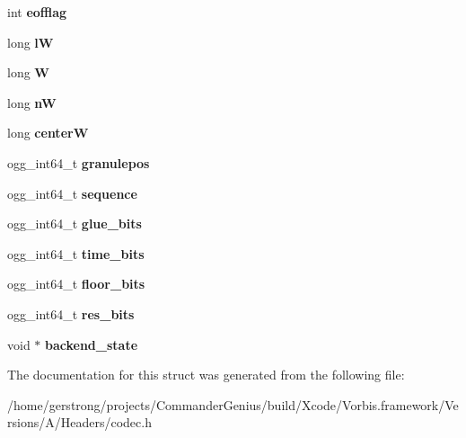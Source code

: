 \begin{DoxyCompactItemize}
\item 
\hypertarget{structvorbis__dsp__state_af48b32e7555d54a5d18a24385f1296d0}{
int {\bfseries eofflag}}
\label{structvorbis__dsp__state_af48b32e7555d54a5d18a24385f1296d0}

\item 
\hypertarget{structvorbis__dsp__state_a7086b355f6ffe286f388e95df943cac0}{
long {\bfseries lW}}
\label{structvorbis__dsp__state_a7086b355f6ffe286f388e95df943cac0}

\item 
\hypertarget{structvorbis__dsp__state_a1cc3a520dcf831fb967341e5095c7b38}{
long {\bfseries W}}
\label{structvorbis__dsp__state_a1cc3a520dcf831fb967341e5095c7b38}

\item 
\hypertarget{structvorbis__dsp__state_a2ada93ee1004bcc0803238ee4416bc1e}{
long {\bfseries nW}}
\label{structvorbis__dsp__state_a2ada93ee1004bcc0803238ee4416bc1e}

\item 
\hypertarget{structvorbis__dsp__state_a241d3dc3b6c931e93ce53cbf69282350}{
long {\bfseries centerW}}
\label{structvorbis__dsp__state_a241d3dc3b6c931e93ce53cbf69282350}

\item 
\hypertarget{structvorbis__dsp__state_af84a7a4855db2744d1ef73f48cb6b352}{
ogg\_\-int64\_\-t {\bfseries granulepos}}
\label{structvorbis__dsp__state_af84a7a4855db2744d1ef73f48cb6b352}

\item 
\hypertarget{structvorbis__dsp__state_a38a8b96daf9d16d8cce0522e203635a6}{
ogg\_\-int64\_\-t {\bfseries sequence}}
\label{structvorbis__dsp__state_a38a8b96daf9d16d8cce0522e203635a6}

\item 
\hypertarget{structvorbis__dsp__state_ae2d065c13e84870fd889c82cd2e7a04f}{
ogg\_\-int64\_\-t {\bfseries glue\_\-bits}}
\label{structvorbis__dsp__state_ae2d065c13e84870fd889c82cd2e7a04f}

\item 
\hypertarget{structvorbis__dsp__state_adef49c2187f4ed3381973274e1b01151}{
ogg\_\-int64\_\-t {\bfseries time\_\-bits}}
\label{structvorbis__dsp__state_adef49c2187f4ed3381973274e1b01151}

\item 
\hypertarget{structvorbis__dsp__state_a2913a4ebbbd6721c53264a2ca8466cea}{
ogg\_\-int64\_\-t {\bfseries floor\_\-bits}}
\label{structvorbis__dsp__state_a2913a4ebbbd6721c53264a2ca8466cea}

\item 
\hypertarget{structvorbis__dsp__state_a3091c7fac6b57c54027c32931a7e6ee0}{
ogg\_\-int64\_\-t {\bfseries res\_\-bits}}
\label{structvorbis__dsp__state_a3091c7fac6b57c54027c32931a7e6ee0}

\item 
\hypertarget{structvorbis__dsp__state_a97ff4df8d289e5e3968029e47d7f8162}{
void $\ast$ {\bfseries backend\_\-state}}
\label{structvorbis__dsp__state_a97ff4df8d289e5e3968029e47d7f8162}

\end{DoxyCompactItemize}


The documentation for this struct was generated from the following file:\begin{DoxyCompactItemize}
\item 
/home/gerstrong/projects/CommanderGenius/build/Xcode/Vorbis.framework/Versions/A/Headers/codec.h\end{DoxyCompactItemize}
